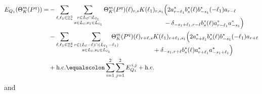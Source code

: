 \documentclass[sn-mathphys, Numbered ,a4paper]{sn-jnl}%
\DeclareMathOperator{\Z}{\mathbb{Z}}
\theoremstyle{plain}
\theoremstyle{definition}
\theoremstyle{remark}
\theoremstyle{plain}
\theoremstyle{definition}
\theoremstyle{remark}
\begin{document}
\begin{alignat}{2}
	E_{Q_1}(\Theta^m_{K}(P^q)) = &-
	\sum\limits_{\ell, \ell_1\in \Z^3_*}\sum\limits_{\substack{r\in L_{\ell} \cap L_{\ell_1}\\ s \in L_{\ell},s_1\in L_{\ell_1}}} \Theta^m_{K}(P^q)(\ell)_{r,s}K(\ell_1)_{r,s_1}
	\begin{aligned}[t]
		&\Big( 2a^*_{r-\ell_1}b^*_{s}(\ell) b^*_{-s_1}(-\ell_1)a_{r-\ell} \\ & -\delta_{-s_1+\ell_1,r-\ell} b^*_{s}(\ell) a^*_{r-\ell_1}a^*_{-s_1}\Big)
	\end{aligned}\nonumber\\
	& -\sum\limits_{\ell, \ell_1\in \Z^3_*}\sum\limits_{\substack{r\in (L_{\ell}-\ell) \cap (L_{\ell_1}-\ell_1)\\ s \in L_{\ell},s_1\in L_{\ell_1} }}\!\!\!\!\!\!\!\!\!
	\begin{aligned}[t] \Theta^m_{K}(P^q)(\ell)_{r+\ell,s}&K(\ell_1)_{r+\ell_1,s_1}
		\Big( 2a^*_{r+\ell_1}b^*_{s}(\ell) b^*_{-s_1}(-\ell_1) a_{r+\ell}\nonumber \\ &+ \delta_{-s_1,r+\ell} b^*_{s}(\ell) a^*_{r+\ell_1}a^*_{-s_1+\ell_1}\Big)
	\end{aligned}\\
	&+ \mathrm{h.c.} \equalscolon \sum\limits_{i=1}^{2}\sum\limits_{j=1}^{2} E_{Q_1}^{\,i,j} + \mathrm{h.c.}\label{eq:prelimEQ1}
\end{alignat}
and
\end{document}
